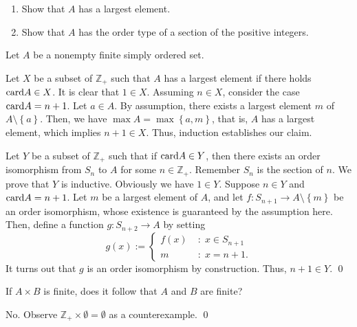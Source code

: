 \documentclass[a4paper,12pt]{article}
\begin{document}
\begin{exe}\leavevmode \par
	\begin{enumerate}
		\item
		      Show that \( A \) has a largest element.
		      
		\item
		      Show that \( A \) has the order type of a section of the positive integers.
	\end{enumerate}
\end{exe}\begin{sol}
	Let \( A \) be a nonempty finite simply ordered set.
	
	Let \( X \) be a subset of \( \mathbb{Z}_{+} \) such that \( A \) has a largest  element if there holds \( \mathrm{card}A \in X \).
	It is clear that \( 1 \in X\).
	Assuming \( n \in X\), consider the case \( \mathrm{card}A = n+1 \).
	Let \( a \in A \).
	By assumption, there exists a largest element
	\( m \)
	of
	\( A \setminus \left\{ a \right\} \).
	Then, we have
	\( \max{A} = \max \left\{ a,m \right\} \),
	that is,
	\( A \)
	has a largest element,
	which implies
	\( n+1 \in X \).
	Thus, induction establishes our claim.
	
	Let \( Y \) be a subset of \( \mathbb{Z}_{+} \)
	such that if
	\( \mathrm{card}A \in Y \),
	then there exists an order isomorphism from \( S_{n} \) to \( A \)
	for some \( n \in \mathbb{Z}_{+} \).
	Remember \( S_n \) is the section of \( n \).
	We prove that \( Y \) is inductive.
	Obviously we have \( 1 \in Y \).
	Suppose \( n \in Y \)
	and
	\( \mathrm{card}A=n+1 \).
	Let \( m \) be a largest element of \( A \),
	and let \( f:S_{n+1} \to A\setminus \left\{ m \right\}\)
	be an order isomorphism,
	whose existence is guaranteed by the assumption here.
	Then, define a function \( g:S_{n+2} \to A \) by setting
	\begin{equation*}
		g(x):=\begin{cases}
			f(x) & \;\mathrm{:}\; x\in S_{n+1} \\
			m    & \;\mathrm{:}\; x=n+1.
		\end{cases}
	\end{equation*}
	It turns out that \( g \) is an order isomorphism by construction.
	Thus, \( n+1 \in Y \).
	\qed\end{sol}

\begin{exe}
	If \( A\times B \) is finite,
	does it follow that \( A \) and \( B \) are finite?
\end{exe}\begin{sol}
	No. Observe \( \mathbb{Z}_{+} \times \emptyset =\emptyset \) as a counterexample.
	\qed\end{sol}
\end{document}
